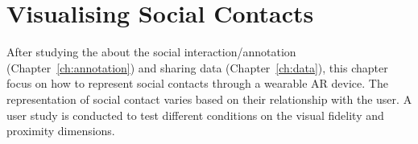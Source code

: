\chapter{Visualising Social Contacts} %
\label{ch:contacts} %

After studying the about the social interaction/annotation (Chapter~\ref{ch:annotation}) and sharing data (Chapter~\ref{ch:data}), this chapter focus on how to represent social contacts through a wearable AR device. The representation of social contact varies based on their relationship with the user. A user study is conducted to test different conditions on the visual fidelity and proximity dimensions. 



